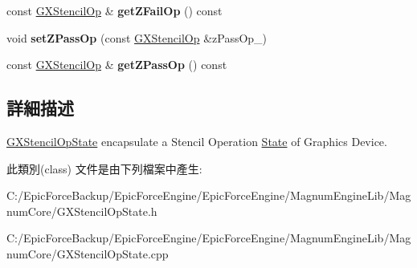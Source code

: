 \begin{DoxyCompactItemize}
\item 
const \hyperlink{class_magnum_1_1_g_x_stencil_op}{G\+X\+Stencil\+Op} \& {\bfseries get\+Z\+Fail\+Op} () const \hypertarget{class_magnum_1_1_g_x_stencil_op_state_ae93d4d758934fa5ae5a44344b39099f6}{}\label{class_magnum_1_1_g_x_stencil_op_state_ae93d4d758934fa5ae5a44344b39099f6}

\item 
void {\bfseries set\+Z\+Pass\+Op} (const \hyperlink{class_magnum_1_1_g_x_stencil_op}{G\+X\+Stencil\+Op} \&z\+Pass\+Op\+\_\+)\hypertarget{class_magnum_1_1_g_x_stencil_op_state_abab4c683ccf57f10d1071273dd6c10c2}{}\label{class_magnum_1_1_g_x_stencil_op_state_abab4c683ccf57f10d1071273dd6c10c2}

\item 
const \hyperlink{class_magnum_1_1_g_x_stencil_op}{G\+X\+Stencil\+Op} \& {\bfseries get\+Z\+Pass\+Op} () const \hypertarget{class_magnum_1_1_g_x_stencil_op_state_ac08a704fafdd984f21778c99bae0d4c1}{}\label{class_magnum_1_1_g_x_stencil_op_state_ac08a704fafdd984f21778c99bae0d4c1}

\end{DoxyCompactItemize}


\subsection{詳細描述}
\hyperlink{class_magnum_1_1_g_x_stencil_op_state}{G\+X\+Stencil\+Op\+State} encapsulate a Stencil Operation \hyperlink{class_magnum_1_1_state}{State} of Graphics Device. 

此類別(class) 文件是由下列檔案中產生\+:\begin{DoxyCompactItemize}
\item 
C\+:/\+Epic\+Force\+Backup/\+Epic\+Force\+Engine/\+Epic\+Force\+Engine/\+Magnum\+Engine\+Lib/\+Magnum\+Core/G\+X\+Stencil\+Op\+State.\+h\item 
C\+:/\+Epic\+Force\+Backup/\+Epic\+Force\+Engine/\+Epic\+Force\+Engine/\+Magnum\+Engine\+Lib/\+Magnum\+Core/G\+X\+Stencil\+Op\+State.\+cpp\end{DoxyCompactItemize}
